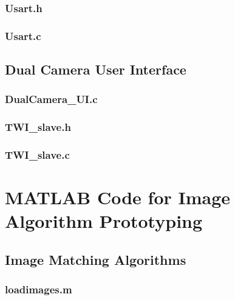 \subsubsection{Usart.h}


\subsubsection{Usart.c}



\subsection{Dual Camera User Interface}

\subsubsection{DualCamera\_UI.c}


\subsubsection{TWI\_slave.h}


\subsubsection{TWI\_slave.c}


\section{MATLAB Code for Image Algorithm Prototyping}
\subsection{Image Matching Algorithms}
\subsubsection{loadimages.m}


